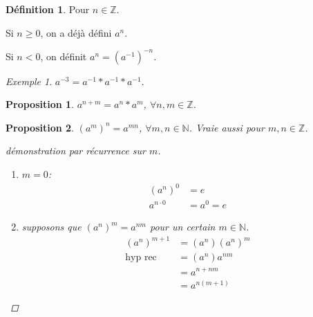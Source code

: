 \documentclass{report}
\newcommand*{\entiers}{\mathbb{Z}}
\newcommand*{\naturels}{\mathbb{N}}
\newtheorem*{prop}{Proposition}
\theoremstyle{definition}
\newtheorem*{defin}{D\'efinition}
\theoremstyle{remark}
\newtheorem*{exem}{Exemple}
\begin{document}
	\begin{defin}
		Pour $n \in \entiers$.

		Si $n \geq 0$, on a d\'ej\`a d\'efini $a^n$.

		Si $n<0$, on d\'efinit $a^n=(a^{-1})^{-n}$.
	\end{defin}
	\begin{exem}
		$a^{-3}=a^{-1}*a^{-1}*a^{-1}$.
	\end{exem}
	\begin{prop}
		$a^{n+m}=a^n*a^m$, $\forall n,m \in \entiers$.
	\end{prop}
	\begin{prop}
		$(a^m)^n=a^{mn}$, $\forall m,n \in \naturels$. Vraie aussi pour $m,n \in \entiers$.
		\begin{proof}[d\'emonstration par r\'ecurrence sur $m$]~

		\begin{enumerate}
			\item $m=0$:
			\begin{align*}
				(a^n)^0&= e\\
				a^{n \cdot 0}&= a^0=e
			\end{align*}
			\item supposons que $(a^n)^m=a^{nm}$ pour un certain $m \in \naturels$.
			\begin{align*}
				(a^n)^{m+1}&= (a^n)(a^n)^m\\
				\text{hyp rec}&= (a^n)a^{nm}\\
				&= a^{n+nm}\\
				&= a^{n(m+1)}
			\end{align*}
		\end{enumerate}
		\end{proof}
	\end{prop}
\end{document}
